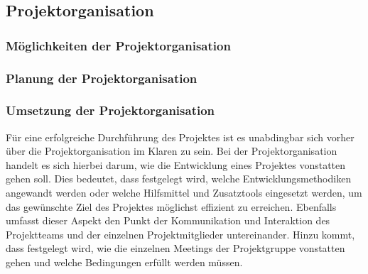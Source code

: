 \subsection{Projektorganisation}
\label{sec:Projektorganisation}

\subsubsection{Möglichkeiten der Projektorganisation}
\label{sec:MoeglichkeitenProjektorganisation}


\subsubsection{Planung der Projektorganisation}
\label{sec:PlanungProjektorganisation}

\subsubsection{Umsetzung der Projektorganisation}
\label{sec:UmsetzungProjektorganisation}

Für eine erfolgreiche Durchführung des Projektes ist es unabdingbar sich vorher
über die Projektorganisation im Klaren zu sein. Bei der Projektorganisation
handelt es sich hierbei darum, wie die Entwicklung eines Projektes vonstatten
gehen soll. Dies bedeutet, dass festgelegt wird, welche Entwicklungsmethodiken
angewandt werden oder welche Hilfsmittel und Zusatztools eingesetzt werden, um
das gewünschte Ziel des Projektes möglichst effizient zu erreichen. Ebenfalls
umfasst dieser Aspekt den Punkt der Kommunikation und Interaktion des
Projektteams und der einzelnen Projektmitglieder untereinander. Hinzu kommt,
dass festgelegt wird, wie die einzelnen Meetings der Projektgruppe vonstatten
gehen und welche Bedingungen erfüllt werden müssen.

